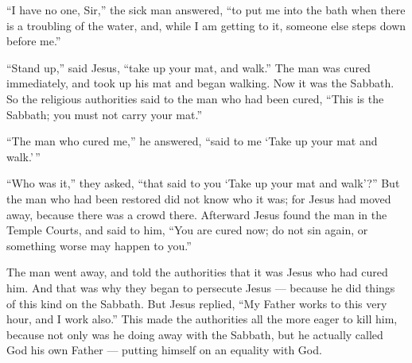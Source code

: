  ``I have no one, Sir,'' the sick man answered, ``to put me
into the bath when there is a troubling of the water, and, while I am
getting to it, someone else steps down before me.''

 ``Stand up,'' said Jesus, ``take up your mat, and walk.''
 The man was cured immediately, and took up his mat and
began walking.  Now it was the Sabbath. So the religious
authorities said to the man who had been cured, ``This is the Sabbath;
you must not carry your mat.''

 ``The man who cured me,'' he answered, ``said to me `Take
up your mat and walk.'\,''

 ``Who was it,'' they asked, ``that said to you `Take up
your mat and walk'?''  But the man who had been restored
did not know who it was; for Jesus had moved away, because there was a
crowd there.  Afterward Jesus found the man in the Temple
Courts, and said to him, ``You are cured now; do not sin again, or
something worse may happen to you.''

 The man went away, and told the authorities that it was
Jesus who had cured him.  And that was why they began to
persecute Jesus --- because he did things of this kind on the Sabbath.
 But Jesus replied, ``My Father works to this very hour,
and I work also.''  This made the authorities all the more
eager to kill him, because not only was he doing away with the Sabbath,
but he actually called God his own Father --- putting himself on an
equality with God.

